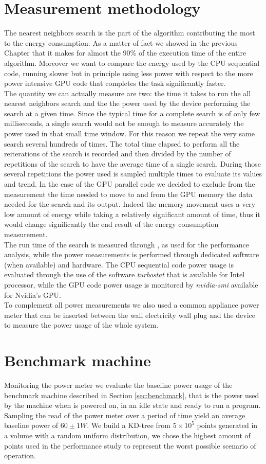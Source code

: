 \section{Measurement methodology}
The nearest neighbors search is the part of the algorithm contributing the most to the energy consumption. As a matter of fact we showed in the previous Chapter that it makes for almost the $90\%$ of the execution time of the entire algorithm. Moreover we want to compare the energy used by the CPU sequential code, running slower but in principle using less power with respect to the more power intensive GPU code that completes the task significantly faster.\\ 
The quantity we can actually measure are two: the time it takes to run the all nearest neighbors search and the the power used by the device performing the search at a given time.
Since the typical time for a complete search is of only few milliseconds, a single search would not be enough to measure accurately the power used in that small time window. For this reason we repeat the very same search several hundreds of times. The total time elapsed to perform all the reiterations of the search is recorded and then divided by the number of repetitions of the search to have the average time of a single search. During those several repetitions the power used is sampled multiple times to evaluate its values and trend. In the case of the GPU parallel code we decided to exclude from the measurement the time needed to move to and from the GPU memory the data needed for the search and its output. Indeed the memory movement uses a very low amount of energy while taking a relatively significant amount of time, thus it would change significantly the end result of the energy consumption measurement.\\
The run time of the search is measured through , as used for the performance analysis, while the power measurements is performed through dedicated software (when available) and hardware. The CPU sequential code power usage is evaluated through the use of the software \textit{turbostat} that is available for Intel processor, while the GPU code power usage is monitored by \textit{nvidia-smi} available for Nvidia's GPU.\\
To complement all power measurements we also used a common appliance power meter that can be inserted between the wall electricity wall plug and the device to measure the power usage of the whole system.

\section{Benchmark machine}
Monitoring the power meter we evaluate the baseline power usage of the benchmark machine described in Section \ref{sec:benchmark}, that is the power used by the machine when is powered on, in an idle state and ready to run a program. Sampling the read of the power meter over a period of time yield an average baseline power of $60 \pm 1 \unit{W}$.
We build a KD-tree from $5 \times 10^5$ points generated in a volume with a random uniform distribution, we chose the highest amount of points used in the performance study to represent the worst possible scenario of operation.

